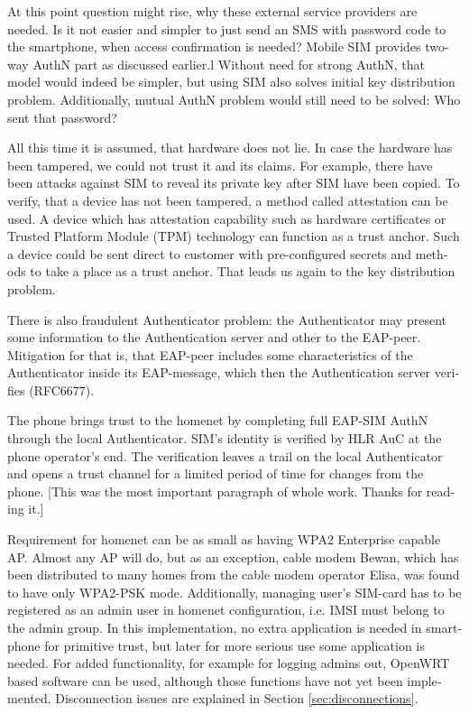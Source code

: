 \documentclass[12pt,a4paper,english]{tutthesis}
\begin{document}
\begin{otherlanguage}{english}
At this point question might rise, why these external service
providers are needed. Is it not easier and simpler to just send 
an SMS with password code to the smartphone, when access confirmation is needed?
Mobile SIM provides two-way AuthN part as discussed earlier.l
Without need for strong AuthN, that model would indeed be 
simpler, but using SIM also solves initial key distribution problem.
Additionally, mutual AuthN problem would still need to be solved:
Who sent that password?



All this time it is assumed, that hardware does not lie. In case
the hardware has been tampered, we could not trust it and its claims.
For example, there have been attacks against SIM to reveal its private
key after SIM have been copied.  To verify, that a device has not been
tampered, a method called attestation can be used.
A device which has attestation capability such as 
hardware certificates or Trusted Platform Module (TPM) technology
can function as a trust anchor.
Such a device could be sent direct to customer with pre-configured
secrets and methods to take a place as a trust anchor. 
That leads us again to the key distribution problem.

There is also fraudulent Authenticator problem: the Authenticator may present some 
information to the Authentication server and other to the EAP-peer.
Mitigation for that is, that EAP-peer includes some 
characteristics of the Authenticator inside its EAP-message, which
then the Authentication server verifies (RFC6677)\cite{rfc6677}.



The phone brings trust to the homenet by completing full EAP-SIM AuthN through
the local Authenticator. SIM's identity is verified by HLR AuC at the phone
operator's end. The verification leaves a trail on the local Authenticator and
opens a trust channel for a limited period of time for changes from the phone.
[This was the most important paragraph of whole work. Thanks for
reading it.]





Requirement for homenet can be as small as having WPA2 Enterprise capable
AP. Almost any AP will do, but as an exception, cable modem Bewan, which 
has been distributed to many homes from the cable modem operator Elisa, was found to have only WPA2-PSK mode.
Additionally, managing user's SIM-card has to be registered as an admin user in homenet 
configuration, i.e. IMSI must belong to the admin group.
In this implementation, no extra application is needed in smartphone
for primitive trust, but later for more serious use some application is needed.
For added functionality, for example for logging admins out, OpenWRT
based software can be used, although those functions have not yet been
implemented. Disconnection issues are explained in Section
\ref{sec:disconnections}.


\end{otherlanguage}
\end{document}
